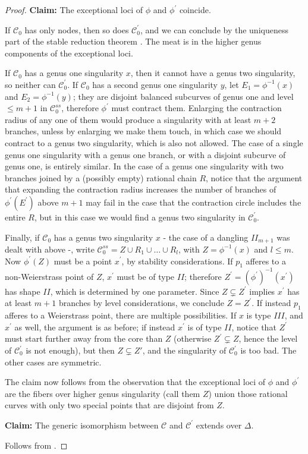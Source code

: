 \documentclass[11pt]{amsart}
\newcommand{\dvr}{\Delta}
\theoremstyle{plain}
\theoremstyle{definition}
\begin{document}
\begin{proof}
 \textbf{Claim:} The exceptional loci of $\phi$ and $\phi^\prime$ coincide.
 
 If $\mathcal C_0$ has only nodes, then so does $\mathcal C^\prime_0$, and we can conclude by the uniqueness part of the stable reduction theorem \cite{DM}. The meat is in the higher genus components of the exceptional loci.
 
 If $\mathcal C_0$ has a genus one singularity $x$, then it cannot have a genus two singularity, so neither can $\mathcal C^\prime_0$. If $\mathcal C_0$ has a second genus one singularity $y$, let $E_1=\phi^{-1}(x)$ and $E_2=\phi^{-1}(y)$; they are disjoint balanced subcurves of genus one and level $\leq m+1$ in $\mathcal C^{ss}_0$, therefore $\phi^\prime$ must contract them. Enlarging the contraction radius of any one of them would produce a singularity with at least $m+2$ branches, unless by enlarging we make them touch, in which case we should contract to a genus two singularity, which is also not allowed. The case of a single genus one singularity with a genus one branch, or with a disjoint subcurve of genus one, is entirely similar. In the case of a genus one singularity with two branches joined by a (possibly empty) rational chain $R$, notice that the argument that expanding the contraction radius increases the number of branches of $\phi^\prime(E^\prime)$ above $m+1$ may fail in the case that the contraction circle includes the entire $R$, but in this case we would find a genus two singularity in $\mathcal C^\prime_0$.
 
 Finally, if $\mathcal C_0$ has a genus two singularity $x$ - the case of a dangling $I\!I_{m+1}$ was dealt with above -, write $\mathcal C^{ss}_0=Z\cup R_1\cup\ldots\cup R_l$, with $Z=\phi^{-1}(x)$ and $l\leq m$. Now $\phi^\prime(Z)$ must be a point $x^\prime$, by stability considerations. If $p_1$ afferes to a non-Weierstrass point of $Z$, $x^\prime$ must be of type $I\!I$; therefore $Z^\prime=(\phi^\prime)^{-1}(x^\prime)$ has shape $I\!I$, which is determined by one parameter. Since $Z\subsetneq Z^\prime$ implies $x^\prime$ has at least $m+1$ branches by level considerations, we conclude $Z=Z^\prime$. If instead $p_1$ afferes to a Weierstrass point, there are multiple possibilities. If $x$ is type $I\!I\!I$, and $x^\prime$ as well, the argument is as before; if instead $x^\prime$ is of type $I\!I$, notice that $Z^\prime$ must start further away from the core than $Z$ (otherwise $Z^\prime\subsetneq Z$, hence the level of $\mathcal C^\prime_0$ is not enough), but then $Z\subsetneq Z\prime$, and the singularity of $\mathcal C^\prime_0$ is too bad. The other cases are symmetric.
 
 The claim now follows from the observation that the exceptional loci of $\phi$ and $\phi^\prime$ are the fibers over higher genus singularity (call them $Z$) union those rational curves with only two special points that are disjoint from $Z$.
 
 \textbf{Claim:} The generic isomorphism between $\mathcal C$ and $\mathcal C^\prime$ extends over $\dvr$.
 
 Follows from \cite[Lemma1.13]{Debarre}.
\end{proof}
\end{document}
